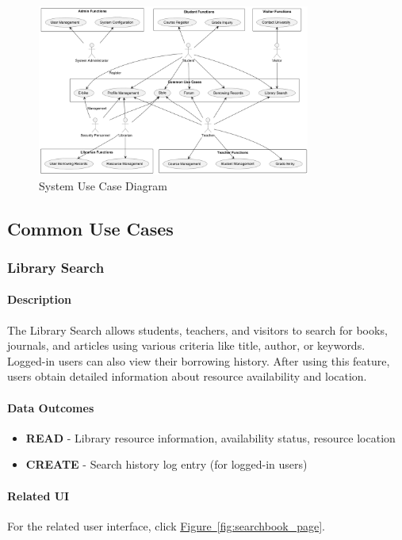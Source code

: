 \documentclass[12pt]{article}
\begin{document}
\begin{figure}[h]
    \centering
    \includegraphics[width=0.8\textwidth]{usecasediagram.png}  %
    \caption{System Use Case Diagram}
    \label{fig:use_case_diagram}
\end{figure}

\subsection{Common Use Cases}
\subsubsection{Library Search}

\paragraph{Description}
The Library Search allows students, teachers, and visitors to search for books, journals, and articles using various criteria like title, author, or keywords. Logged-in users can also view their borrowing history. After using this feature, users obtain detailed information about resource availability and location.
\paragraph{Data Outcomes}
\begin{itemize}
    \item \textbf{READ} - Library resource information, availability status, resource location
    \item \textbf{CREATE} - Search history log entry (for logged-in users)
\end{itemize}

\paragraph{Related UI}
For the related user interface, click \hyperref[fig:searchbook_page]{Figure~\ref*{fig:searchbook_page}}.
\end{document}
